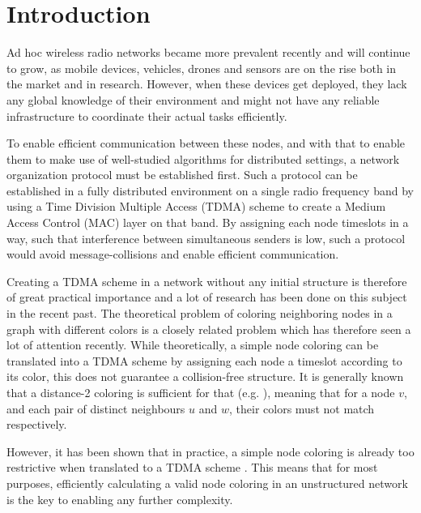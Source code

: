 
\chapter{Introduction}
\label{ch:introduction}

Ad hoc wireless radio networks became more prevalent recently and will continue to grow, as mobile devices, vehicles, drones and sensors are on the rise both in the market and in research. However, when these devices get deployed, they lack any global knowledge of their environment and might not have any reliable infrastructure to coordinate their actual tasks efficiently.

To enable efficient communication between these nodes, and with that to enable them to make use of well-studied algorithms for distributed settings, a network organization protocol must be established first. Such a protocol can be established in a fully distributed environment on a single radio frequency band by using a Time Division Multiple Access (TDMA) scheme to create a Medium Access Control (MAC) layer on that band. By assigning each node timeslots in a way, such that interference between simultaneous senders is low, such a protocol would avoid message-collisions and enable efficient communication.

Creating a TDMA scheme in a network without any initial structure is therefore of great practical importance and a lot of research has been done on this subject in the recent past. The theoretical problem of coloring neighboring nodes in a graph with different colors is a closely related problem which has therefore seen a lot of attention recently. While theoretically, a simple node coloring can be translated into a TDMA scheme by assigning each node a timeslot according to its color, this does not guarantee a collision-free structure. It is generally known that a distance-2 coloring is sufficient for that (e.g. \cite{ramanathan1993scheduling}), meaning that for a node $v$, and each pair of distinct neighbours $u$ and $w$, their colors must not match respectively.

However, it has been shown that in practice, a simple node coloring is already too restrictive when translated to a TDMA scheme \cite{moscibroda2006protocol}. This means that for most purposes, efficiently calculating a valid node coloring in an unstructured network is the key to enabling any further complexity.


